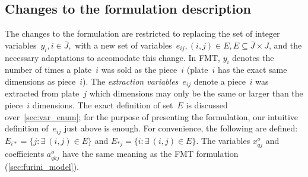 \documentclass[ppgc,tese,english,formais,babel]{iiufrgs}
\begin{document}

\subsection{Changes to the formulation description}
\label{sec:enhanced}

The changes to the formulation are restricted to replacing the set of integer variables~\(y_i, i \in \bar{J},\) with a new set of variables~\(e_{ij}, (i, j) \in E, E \subseteq \bar{J} \times J\), and the necessary adaptations to accomodate this change.
In FMT, \(y_i\) denotes the number of times a plate~\(i\) was sold as the piece~\(i\) (plate~\(i\) has the exact same dimensions as piece~\(i\)).
The \emph{extraction variables}~\(e_{ij}\) denote a piece~\(i\) was extracted from plate~\(j\) which dimensions may only be the same or larger than the piece~\(i\) dimensions.
The exact definition of set~\(E\) is discussed over~\cref{sec:var_enum}; for the purpose of presenting the formulation, our intuitive definition of~\(e_{ij}\) just above is enough.
For convenience, the following are defined: \(E_{i*} = \{ j : \exists~(i, j) \in E \}\) and \(E_{*j} = \{i : \exists~(i, j) \in E \}\).
The variables \(x^o_{qj}\) and coefficients \(a^o_{qkj}\) have the same meaning as the FMT formulation (\cref{sec:furini_model}).
\end{document}
